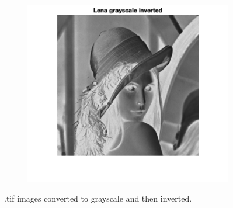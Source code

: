 \documentclass{article}
\begin{document}
\begin{enumerate}
\begin{figure}
\begin{subfigure}[c]{0.45\textwidth}
            \includegraphics[width=\textwidth]{images/lena_gray_inv.png}
        \end{subfigure}
        \caption{.tif images converted to grayscale and then inverted.}
        \label{fig:gray}
    \end{figure}
    

\end{enumerate}
\end{document}
